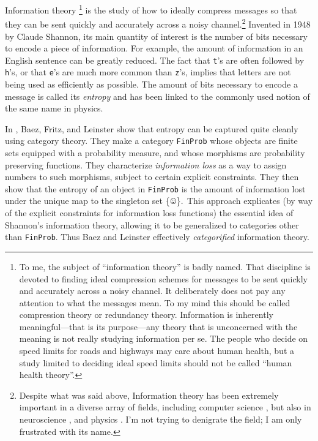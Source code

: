 \documentclass[../main/CT4S-EN-RU]{subfiles}
\begin{document}
\begin{blockENG}
Information theory 
\footnote{To me, the subject of “information theory” is badly named. That discipline is devoted to finding ideal compression schemes for messages to be sent quickly and accurately across a noisy channel. It deliberately does not pay any attention to what the messages mean. To my mind this should be called compression theory or redundancy theory. Information is inherently meaningful—that is its purpose—any theory that is unconcerned with the meaning is not really studying information per se. The people who decide on speed limits for roads and highways may care about human health, but a study limited to deciding ideal speed limits should not be called “human health theory”.} 
is the study of how to ideally compress messages so that they can be sent quickly and accurately across a noisy channel.\footnote{Despite what was said above, Information theory has been extremely important in a diverse array of fields, including computer science \cite{MacK}, but also in neuroscience \cite{Bar}, \cite{Lin} and physics \cite{Eve}. I'm not trying to denigrate the field; I am only frustrated with its name.} Invented in 1948 by Claude Shannon, its main quantity of interest is the number of bits necessary to encode a piece of information. For example, the amount of information in an English sentence can be greatly reduced. The fact that {\tt t}'s are often followed by {\tt h}'s, or that {\tt e}'s are much more common than {\tt z}'s, implies that letters are not being used as efficiently as possible. The amount of bits necessary to encode a message is called its {\em entropy} and has been linked to the commonly used notion of the same name in physics. 
\end{blockENG}

\begin{blockRUS}
\end{blockRUS}

\begin{blockENG}
In \cite{BFL}, Baez, Fritz, and Leinster show that entropy can be captured quite cleanly using category theory. They make a category {\tt FinProb} whose objects are finite sets equipped with a probability measure, and whose morphisms are probability preserving functions. They characterize {\em information loss} as a way to assign numbers to such morphisms, subject to certain explicit constraints. They then show that the entropy of an object in {\tt FinProb} is the amount of information lost under the unique map to the singleton set $\singleton.$ This approach explicates (by way of the explicit constraints for information loss functions) the essential idea of Shannon's information theory, allowing it to be generalized to categories other than {\tt FinProb}. Thus Baez and Leinster effectively {\em categorified} information theory.
\end{blockENG}
\end{document}
